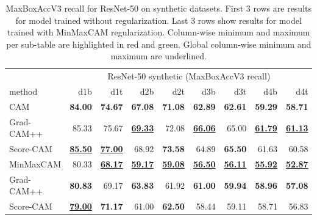 \begin{table}[ht]
\centering
\begin{tabular}{lrrrrrrrr}
\toprule
 & \multicolumn{8}{c}{ResNet-50 synthetic (MaxBoxAccV3 recall)} \\
method & d1b & d1t & d2b & d2t & d3b & d3t & d4b & d4t \\
\cmidrule(lr){1-1} \cmidrule(lr){2-9}
CAM & \color{purple} \bfseries 84.00 & \color{purple} \bfseries 74.67 & \color{purple} \bfseries 67.08 & \color{purple} \bfseries 71.08 & \color{purple} \bfseries 62.89 & \color{purple} \bfseries 62.61 & \color{purple} \bfseries 59.29 & \color{purple} \bfseries 58.71 \\
Grad-CAM++ & 85.33 & 75.67 & \color{teal} \bfseries \underline{69.33} & 72.08 & \color{teal} \bfseries \underline{66.06} & 65.00 & \color{teal} \bfseries \underline{61.79} & \color{teal} \bfseries \underline{61.13} \\
Score-CAM & \color{teal} \bfseries \underline{85.50} & \color{teal} \bfseries \underline{77.00} & 68.92 & \color{teal} \bfseries 73.58 & 64.89 & \color{teal} \bfseries 65.50 & 61.63 & 60.58 \\
\cmidrule(lr){1-1} \cmidrule(lr){2-9}
MinMaxCAM & 80.33 & \color{purple} \bfseries \underline{68.17} & \color{purple} \bfseries \underline{59.17} & \color{purple} \bfseries \underline{59.08} & \color{purple} \bfseries \underline{56.50} & \color{purple} \bfseries \underline{56.11} & \color{purple} \bfseries \underline{55.92} & \color{purple} \bfseries \underline{52.87} \\
Grad-CAM++ & \color{teal} \bfseries 80.83 & 69.17 & \color{teal} \bfseries 63.83 & 61.92 & \color{teal} \bfseries 61.00 & \color{teal} \bfseries 59.94 & \color{teal} \bfseries 58.96 & \color{teal} \bfseries 57.08 \\
Score-CAM & \color{purple} \bfseries \underline{79.00} & \color{teal} \bfseries 71.17 & 61.00 & \color{teal} \bfseries 62.50 & 58.44 & 59.11 & 58.71 & 56.83 \\
\bottomrule
\end{tabular}
\caption[MaxBoxAccV3 recall for ResNet-50 on synthetic datasets]{MaxBoxAccV3 recall for ResNet-50 on synthetic datasets. First 3 rows are results for model trained without regularization. Last 3 rows show results for model trained with MinMaxCAM regularization. Column-wise minimum and maximum per sub-table are highlighted in red and green. Global column-wise minimum and maximum are underlined.}
\label{tab:maxboxaccv3_recall_resnet50_synthetic}
\end{table}

